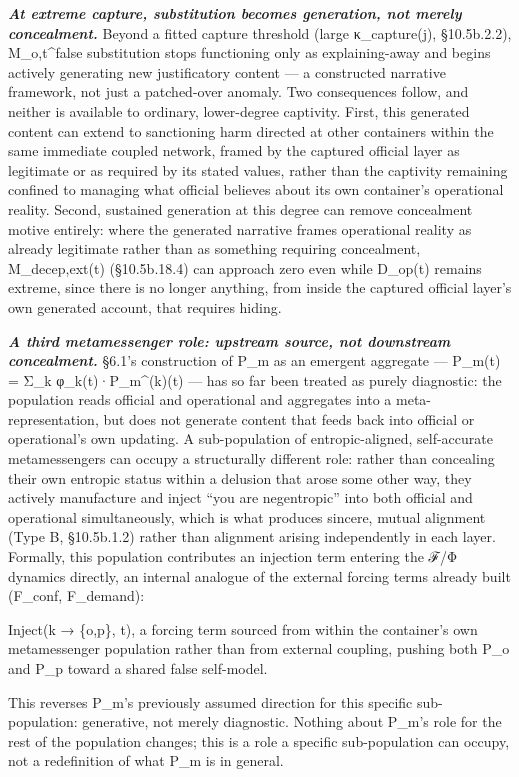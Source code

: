 \documentclass[
]{article}
\begin{document}
\emph{\textbf{At extreme capture, substitution becomes generation, not
merely concealment.}} Beyond a fitted capture threshold (large
κ\_capture(j), §10.5b.2.2), M\_o,t\^{}false substitution stops
functioning only as explaining-away and begins actively generating new
justificatory content --- a constructed narrative framework, not just a
patched-over anomaly. Two consequences follow, and neither is available
to ordinary, lower-degree captivity. First, this generated content can
extend to sanctioning harm directed at other containers within the same
immediate coupled network, framed by the captured official layer as
legitimate or as required by its stated values, rather than the
captivity remaining confined to managing what official believes about
its own container's operational reality. Second, sustained generation at
this degree can remove concealment motive entirely: where the generated
narrative frames operational reality as already legitimate rather than
as something requiring concealment, M\_decep,ext(t) (§10.5b.18.4) can
approach zero even while D\_op(t) remains extreme, since there is no
longer anything, from inside the captured official layer's own generated
account, that requires hiding.

\emph{\textbf{A third metamessenger role: upstream source, not
downstream concealment.}} §6.1's construction of P\_m as an emergent
aggregate --- P\_m(t) = Σ\_k φ\_k(t)·P\_m\^{}(k)(t) --- has so far been
treated as purely diagnostic: the population reads official and
operational and aggregates into a meta-representation, but does not
generate content that feeds back into official or operational's own
updating. A sub-population of entropic-aligned, self-accurate
metamessengers can occupy a structurally different role: rather than
concealing their own entropic status within a delusion that arose some
other way, they actively manufacture and inject ``you are negentropic''
into both official and operational simultaneously, which is what
produces sincere, mutual alignment (Type B, §10.5b.1.2) rather than
alignment arising independently in each layer. Formally, this population
contributes an injection term entering the ℱ/Φ dynamics directly, an
internal analogue of the external forcing terms already built (F\_conf,
F\_demand):

Inject(k → \{o,p\}, t), a forcing term sourced from within the
container's own metamessenger population rather than from external
coupling, pushing both P\_o and P\_p toward a shared false self-model.

This reverses P\_m's previously assumed direction for this specific
sub-population: generative, not merely diagnostic. Nothing about P\_m's
role for the rest of the population changes; this is a role a specific
sub-population can occupy, not a redefinition of what P\_m is in
general.
\end{document}
